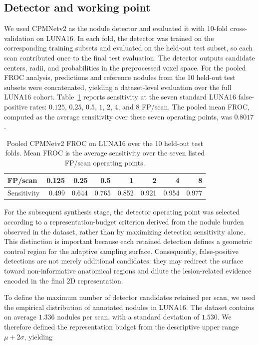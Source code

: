 \documentclass[preprint,12pt]{elsarticle}
\begin{document}
\subsection{Detector and working point}

We used CPMNetv2 as the nodule detector and evaluated it with 10-fold cross-validation on LUNA16. In each fold, the detector was trained on the corresponding training subsets and evaluated on the held-out test subset, so each scan contributed once to the final test evaluation. The detector outputs candidate centers, radii, and probabilities in the preprocessed voxel space. For the pooled FROC analysis, predictions and reference nodules from the 10 held-out test subsets were concatenated, yielding a dataset-level evaluation over the full LUNA16 cohort. Table~\ref{tab:detector_froc} reports sensitivity at the seven standard LUNA16 false-positive rates: $0.125$, $0.25$, $0.5$, $1$, $2$, $4$, and $8$ FP/scan. The pooled mean FROC, computed as the average sensitivity over these seven operating points, was $0.8017$.

\begin{table}[t]
\centering
\caption{Pooled CPMNetv2 FROC on LUNA16 over the 10 held-out test folds. Mean FROC is the average sensitivity over the seven listed FP/scan operating points.}
\label{tab:detector_froc}
\begin{tabular}{lrrrrrrr}
\toprule
FP/scan & 0.125 & 0.25 & 0.5 & 1 & 2 & 4 & 8 \\
\midrule
Sensitivity & 0.499 & 0.644 & 0.765 & 0.852 & 0.921 & 0.954 & 0.977 \\
\bottomrule
\end{tabular}
\end{table}

For the subsequent synthesis stage, the detector operating point was selected according to a representation-budget criterion derived from the nodule burden observed in the dataset, rather than by maximizing detection sensitivity alone. This distinction is important because each retained detection defines a geometric control region for the adaptive sampling surface. Consequently, false-positive detections are not merely additional candidates: they may redirect the surface toward non-informative anatomical regions and dilute the lesion-related evidence encoded in the final 2D representation.

To define the maximum number of detector candidates retained per scan, we used the empirical distribution of annotated nodules in LUNA16. The dataset contains on average $1.336$ nodules per scan, with a standard deviation of $1.530$. We therefore defined the representation budget from the descriptive upper range $\mu + 2\sigma$, yielding
\end{document}
